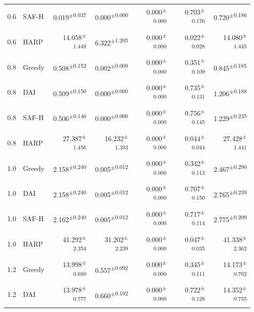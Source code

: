 \documentclass[final,5p]{elsarticle}
\begin{document}
\begin{table}[p]
\begin{tabular}{llrrrrr}
0.6 & SAF-H & 0.019\textsuperscript{$\pm$0.037} & 0.000\textsuperscript{$\pm$0.000} & 0.000\textsuperscript{$\pm$0.000} & 0.703\textsuperscript{$\pm$0.176} & 0.720\textsuperscript{$\pm$0.186} \\
0.6 & HARP & 14.058\textsuperscript{$\pm$1.448} & 6.322\textsuperscript{$\pm$1.205} & 0.000\textsuperscript{$\pm$0.000} & 0.022\textsuperscript{$\pm$0.028} & 14.080\textsuperscript{$\pm$1.445} \\
0.8 & Greedy & 0.508\textsuperscript{$\pm$0.152} & 0.002\textsuperscript{$\pm$0.009} & 0.000\textsuperscript{$\pm$0.000} & 0.351\textsuperscript{$\pm$0.109} & 0.845\textsuperscript{$\pm$0.185} \\
0.8 & DAI & 0.509\textsuperscript{$\pm$0.150} & 0.000\textsuperscript{$\pm$0.000} & 0.000\textsuperscript{$\pm$0.000} & 0.735\textsuperscript{$\pm$0.131} & 1.206\textsuperscript{$\pm$0.188} \\
0.8 & SAF-H & 0.506\textsuperscript{$\pm$0.146} & 0.000\textsuperscript{$\pm$0.000} & 0.000\textsuperscript{$\pm$0.000} & 0.756\textsuperscript{$\pm$0.145} & 1.229\textsuperscript{$\pm$0.235} \\
0.8 & HARP & 27.387\textsuperscript{$\pm$1.456} & 16.232\textsuperscript{$\pm$1.393} & 0.000\textsuperscript{$\pm$0.000} & 0.044\textsuperscript{$\pm$0.044} & 27.428\textsuperscript{$\pm$1.441} \\
1.0 & Greedy & 2.158\textsuperscript{$\pm$0.240} & 0.005\textsuperscript{$\pm$0.012} & 0.000\textsuperscript{$\pm$0.000} & 0.342\textsuperscript{$\pm$0.113} & 2.467\textsuperscript{$\pm$0.290} \\
1.0 & DAI & 2.158\textsuperscript{$\pm$0.240} & 0.005\textsuperscript{$\pm$0.012} & 0.000\textsuperscript{$\pm$0.000} & 0.707\textsuperscript{$\pm$0.150} & 2.765\textsuperscript{$\pm$0.239} \\
1.0 & SAF-H & 2.162\textsuperscript{$\pm$0.240} & 0.005\textsuperscript{$\pm$0.012} & 0.000\textsuperscript{$\pm$0.000} & 0.717\textsuperscript{$\pm$0.114} & 2.775\textsuperscript{$\pm$0.209} \\
1.0 & HARP & 41.292\textsuperscript{$\pm$2.354} & 31.202\textsuperscript{$\pm$2.239} & 0.000\textsuperscript{$\pm$0.000} & 0.047\textsuperscript{$\pm$0.035} & 41.338\textsuperscript{$\pm$2.362} \\
1.2 & Greedy & 13.998\textsuperscript{$\pm$0.688} & 0.557\textsuperscript{$\pm$0.092} & 0.000\textsuperscript{$\pm$0.000} & 0.345\textsuperscript{$\pm$0.111} & 14.173\textsuperscript{$\pm$0.702} \\
1.2 & DAI & 13.978\textsuperscript{$\pm$0.777} & 0.660\textsuperscript{$\pm$0.192} & 0.000\textsuperscript{$\pm$0.000} & 0.722\textsuperscript{$\pm$0.128} & 14.352\textsuperscript{$\pm$0.755} \\

\end{tabular}
\end{table}
\end{document}
